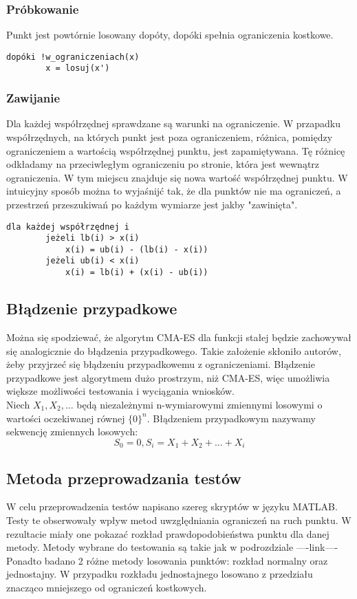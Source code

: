 \documentclass{mini}
\begin{document}
\subsubsection{Próbkowanie}
Punkt jest powtórnie losowany dopóty, dopóki spełnia ograniczenia kostkowe.

\begin{Verbatim}[baselinestretch=1.1]
	dopóki !w_ograniczeniach(x)
		x = losuj(x')
\end{Verbatim}

\subsubsection{Zawijanie}
Dla każdej współrzędnej sprawdzane są warunki na ograniczenie. W przapadku współrzędnych, na których punkt jest poza ograniczeniem, różnica, pomiędzy ograniczeniem a wartością współrzędnej punktu, jest zapamiętywana. Tę różnicę odkładamy na przeciwległym ograniczeniu po stronie, która jest wewnątrz ograniczenia. W tym miejscu znajduje się nowa wartość współrzędnej punktu. W intuicyjny sposób można to wyjaśnijć tak, że dla punktów nie ma ograniczeń, a przestrzeń przeszukiwań po każdym wymiarze jest jakby "zawinięta".

\begin{Verbatim}[baselinestretch=1.1]
	dla każdej współrzędnej i
		jeżeli lb(i) > x(i)
			x(i) = ub(i) - (lb(i) - x(i))
		jeżeli ub(i) < x(i)
			x(i) = lb(i) + (x(i) - ub(i))
\end{Verbatim}

\subsection{Błądzenie przypadkowe}

Można się spodziewać, że algorytm CMA-ES dla funkcji stałej będzie zachowywał się analogicznie do błądzenia przypadkowego. Takie założenie skłoniło autorów, żeby przyjrzeć się błądzeniu przypadkowemu z ograniczeniami. Błądzenie przypadkowe jest algorytmem dużo prostrzym, niż CMA-ES, więc umożliwia  większe możliwości testowania i wyciągania wniosków.\\
Niech $ X_1, X_2, ... $ będą niezależnymi n-wymiarowymi zmiennymi losowymi o wartości oczekiwanej równej $ \{0\}^n $. Błądzeniem przypadkowym nazywamy sekwencję zmiennych losowych:
\begin{equation}
S_0 = 0, S_i=X_1+X_2+...+X_i
\end{equation}

\subsection{Metoda przeprowadzania testów}
W celu przeprowadzenia testów napisano szereg skryptów w języku MATLAB. Testy te obserwowały wpływ metod uwzględniania ograniczeń na ruch punktu. W rezultacie miały one pokazać rozkład prawdopodobieństwa punktu dla danej metody. Metody wybrane do testowania są takie jak w podrozdziale ----link----
Ponadto badano 2 różne metody losowania punktów: rozkład normalny oraz jednostajny. W przypadku rozkładu jednostajnego losowano z przedziału znacząco mniejszego od ograniczeń kostkowych.
\end{document}
